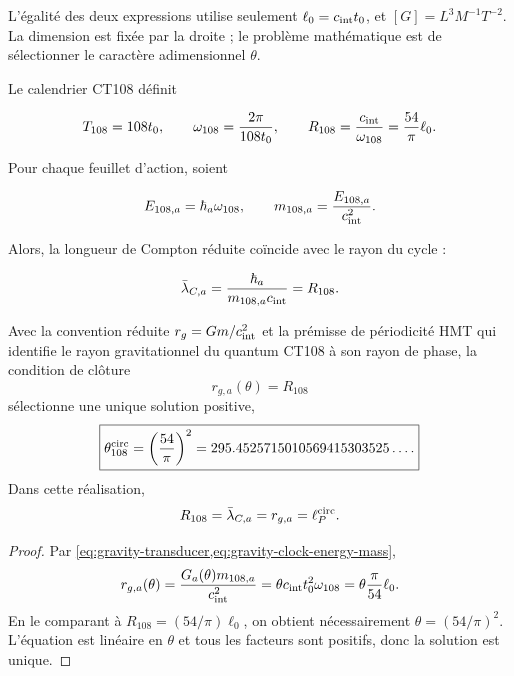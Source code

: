 L'égalité des deux expressions utilise seulement
\(\ell_0=c_{\rm int}t_0\), et
\([G]=L^3M^{-1}T^{-2}\). La dimension est fixée par la droite ; le
problème mathématique est de sélectionner le caractère adimensionnel \(\theta\).

Le calendrier CT108 définit

\begin{equation}
\label{eq:gravity-clock108}
T_{108}=108t_0,
\qquad
\omega_{108}=\frac{2\pi}{108t_0},
\qquad
R_{108}=\frac{c_{\rm int}}{\omega_{108}}
=\frac{54}{\pi}\ell_0.
\end{equation}

Pour chaque feuillet d'action, soient

\begin{equation}
\label{eq:gravity-clock-energy-mass}
E_{108,a}=\hbar_a\omega_{108},
\qquad
m_{108,a}=\frac{E_{108,a}}{c_{\rm int}^2}.
\end{equation}

Alors, la longueur de Compton réduite coïncide avec le rayon du cycle :

\begin{equation}
\label{eq:gravity-compton-clock}
\bar\lambda_{C,a}
=\frac{\hbar_a}{m_{108,a}c_{\rm int}}
=R_{108}.
\end{equation}

\begin{theorem}
\label{thm:gravity-circular-selector}
Avec la convention réduite
\(r_g=Gm/c_{\rm int}^2\) et la prémisse de périodicité HMT qui identifie le rayon
gravitationnel du quantum CT108 à son rayon de phase, la condition de clôture
\begin{equation}
\label{eq:gravity-closing-condition}
r_{g,a}(\theta)=R_{108}
\end{equation}
sélectionne une unique solution positive,
\begin{equation}
\label{eq:gravity-theta108}
\boxed{
\theta_{108}^{\rm circ}=\left(\frac{54}{\pi}\right)^2
=295.4525715010569415303525\ldots .}
\end{equation}
Dans cette réalisation,
\begin{equation}
\label{eq:gravity-four-lengths}
R_{108}=\bar\lambda_{C,a}=r_{g,a}=\ell_P^{\rm circ}.
\end{equation}
\end{theorem}

\begin{proof}
Par \cref{eq:gravity-transducer,eq:gravity-clock-energy-mass},
\[
r_{g,a}(\theta)
=\frac{G_a(\theta)m_{108,a}}{c_{\rm int}^2}
=\theta c_{\rm int}t_0^2\omega_{108}
=\theta\frac{\pi}{54}\ell_0.
\]
En le comparant à
\(R_{108}=(54/\pi)\ell_0\), on obtient nécessairement
\(\theta=(54/\pi)^2\). L'équation est linéaire en \(\theta\) et tous les
facteurs sont positifs, donc la solution est unique.
\end{proof}

